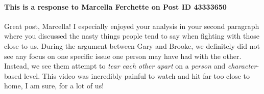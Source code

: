     \paragraph{This is a response to Marcella Ferchette on Post ID 43333650}
      Great post, Marcella! I especially enjoyed your analysis in your second
        paragraph where you discussed the nasty things people tend to say when
        fighting with those close to us. During the argument between Gary and
        Brooke, we definitely did not see any focus on one specific issue one
        person may have had with the other. Instead, we see them attempt to
        \textit{tear each other apart} on a \textit{person} and
        \textit{character}-based level. This video was incredibly painful to
        watch and hit far too close to home, I am sure, for a lot of us!
